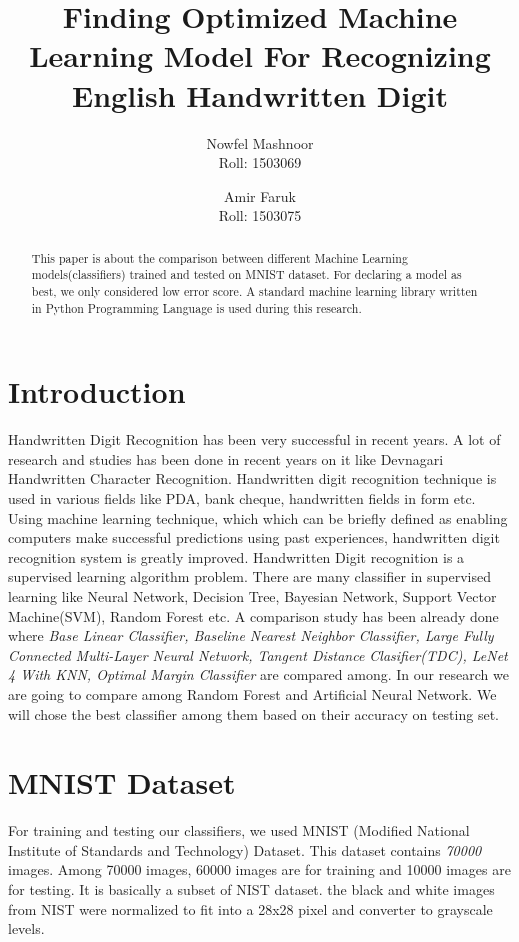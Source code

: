 \documentclass[12pt,a4paper]{article}
\title{Finding Optimized Machine Learning Model For Recognizing English Handwritten Digit}
\author{Nowfel Mashnoor\\Roll: 1503069\and Amir Faruk\\Roll: 1503075}
\begin{document}
\date{}
\maketitle

\begin{abstract}
This paper is about the comparison between different Machine Learning models(classifiers) trained and tested on MNIST dataset. For declaring a model as best, we only considered low error score. A standard machine learning library written in Python Programming Language is used during this research. 
\end{abstract}

\section{Introduction}
Handwritten Digit Recognition has been very successful in recent years. A lot of research and studies has been done in recent years on it like Devnagari Handwritten Character Recognition\cite{pal2009comparative}. Handwritten digit recognition technique is used in various fields like PDA, bank cheque, handwritten fields in form etc.\cite{plamondon2000online} Using machine learning technique, which which can be briefly defined as enabling computers make successful predictions using past experiences, \cite{bacstanlar2014introduction} handwritten digit recognition system is greatly improved. Handwritten Digit recognition is a supervised learning algorithm problem. There are many classifier in supervised learning like Neural Network, Decision Tree,  Bayesian Network, Support Vector Machine(SVM), Random Forest etc\cite{kotsiantis2007supervised}. A comparison study has been already done where \textit{Base Linear Classifier, Baseline Nearest Neighbor Classifier, Large Fully Connected Multi-Layer Neural Network, Tangent Distance Clasifier(TDC), LeNet 4 With KNN, Optimal Margin Classifier} are compared among.\cite{lecun1995learning} In our research we are going to compare among Random Forest and Artificial Neural Network. We will chose the best classifier among them based on their accuracy on testing set. 

\section{MNIST Dataset}

For training and testing our classifiers, we used MNIST (Modified National Institute of Standards and Technology) Dataset. This dataset contains \textit{70000} images. Among 70000 images, 60000 images are for training and 10000 images are for testing\cite{kussul2004improved}.  It is basically a subset of NIST dataset. the black and white images from NIST were normalized to fit into a 28x28 pixel and converter to grayscale levels.\cite{lecuncourant}
\end{document}
